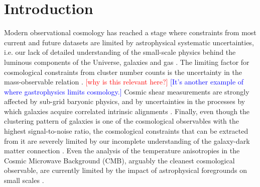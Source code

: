 \documentclass[useAMS,usenatbib]{mn2e}
\newcommand{\MB}[1]{\textcolor{red}{#1}}
\newcommand{\DA}[1]{\textcolor{blue}{#1}}
\begin{document}
\section{Introduction}\label{sec:intro}
  Modern observational cosmology has reached a stage where constraints from most current and future datasets are limited by astrophysical systematic uncertainties, i.e. our lack of detailed understanding of the small-scale physics behind the luminous components of the Universe, galaxies and gas \citep[e.g.][]{2011MNRAS.415.3649V,2011MNRAS.417.2020S,2014JCAP...04..028F,2015MNRAS.454.2451E,2015MNRAS.454.1958M,2015JCAP...12..049S,2019MNRAS.488.1652H,2019JCAP...03..020S,2019OJAp....2E...4C}. The limiting factor for cosmological constraints from cluster number counts is the uncertainty in the mass-observable relation \citep{2009ApJ...692.1060V,2010ApJ...722.1180V,2011ApJ...732...44S,2013JCAP...07..008H,2014MNRAS.440.2077M,2014A&A...571A..20P,2015MNRAS.446.2205M,2016A&A...594A..24P,2016ApJ...832...95D,2019ApJ...878...55B}. \MB{[why is this relevant here?]} \DA{[It's another example of where gastrophysics limits cosmology.]} Cosmic shear measurements are strongly affected by sub-grid baryonic physics, and by uncertainties in the processes by which galaxies acquire correlated intrinsic alignments \citep[e.g.][]{2001MNRAS.320L...7C,2002MNRAS.332..788M,2004PhRvD..70f3526H,2017MNRAS.465.2033J,2018PhRvD..98d3528T,2018arXiv181206076H,2018ARA&A..56..393M,2018arXiv181106989S}. Finally, even though the clustering pattern of galaxies is one of the cosmological observables with the highest signal-to-noise ratio, the cosmological constraints that can be extracted from it are severely limited by our incomplete understanding of the galaxy-dark matter connection \citep[see e.g.][and references therein]{2018ARA&A..56..435W}. Even the analysis of the temperature anisotropies in the Cosmic Microwave Background (CMB), arguably the cleanest cosmological observable, are currently limited by the impact of astrophysical foregrounds on small scales \citep{2014ApJ...782...74H,2017JCAP...06..031L,2019arXiv190712875P}.
  
\end{document}
